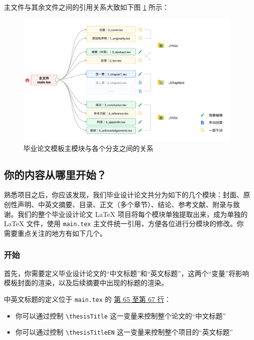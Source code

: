 主文件与其余文件之间的引用关系大致如下图 \ref{grad_thesis_main_submodule} 所示：

\begin{figure}[H]
  \center
  \includegraphics[width=\textwidth]{images/grad_thesis.png}
  \caption{毕业论文模板主模块与各个分支之间的关系}
  \label{grad_thesis_main_submodule}
\end{figure}

\subsection{你的内容从哪里开始？}

熟悉项目之后，你应该发现，我们毕业设计论文共分为如下的几个模块：封面、原创性声明、中英文摘要、目录、正文（多个章节）、结论、参考文献、附录与致谢。我们的整个毕业设计论文 {\LaTeX} 项目将每个模块单独提取出来，成为单独的 {\LaTeX} 文件，使用 \texttt{main.tex} 主文件统一引用，方便各位进行分模块的修改。你需要重点关注的地方有如下几个。

\subsubsection{开始}

首先，你需要定义毕业设计论文的“中文标题”和“英文标题”，这两个“变量”将影响模板封面的渲染，以及后续摘要中出现的标题的渲染。

中英文标题的定义位于 \texttt{main.tex} 的 \href{https://github.com/spencerwooo/BIThesis/blob/master/graduation-thesis/main.tex#L65-L67}{第 65 至第 67 行}：

\begin{itemize}
  \item 你可以通过控制 \texttt{\textbackslash thesisTitle} 这一变量来控制整个论文的“中文标题”
  \item 你可以通过控制 \texttt{\textbackslash thesisTitleEN} 这一变量来控制整个项目的“英文标题”
\end{itemize}

